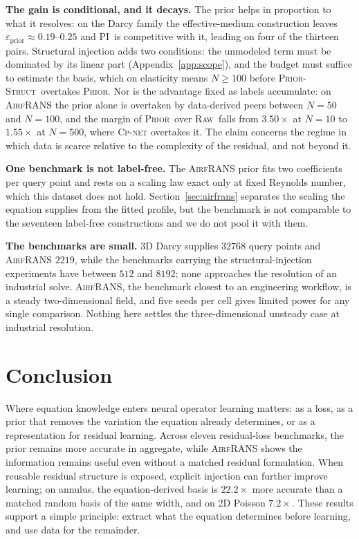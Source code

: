 \documentclass{article}
\newcommand{\armraw}{\textsc{Raw}}
\newcommand{\armpi}{\textsc{PI}}
\newcommand{\armprior}{\textsc{Prior}}
\newcommand{\armstruct}{\textsc{Prior-Struct}}
\begin{document}
\textbf{The gain is conditional, and it decays.} The prior helps in proportion to what it resolves: on the Darcy family the effective-medium construction leaves $\varepsilon_{\mathrm{prior}}\approx0.19$--$0.25$ and \armpi\ is competitive with it, leading on four of the thirteen pairs. Structural injection adds two conditions: the unmodeled term must be dominated by its linear part (Appendix~\ref{app:scope}), and the budget must suffice to estimate the basis, which on elasticity means $N\ge100$ before \armstruct\ overtakes \armprior. Nor is the advantage fixed as labels accumulate: on \textsc{AirfRANS} the prior alone is overtaken by data-derived peers between $N=50$ and $N=100$, and the margin of \armprior\ over \armraw\ falls from $3.50\times$ at $N=10$ to $1.55\times$ at $N=500$, where \textsc{Cp-net} overtakes it. The claim concerns the regime in which data is scarce relative to the complexity of the residual, and not beyond it.

\textbf{One benchmark is not label-free.} The \textsc{AirfRANS} prior fits two
coefficients per query point and rests on a scaling law exact only at fixed Reynolds
number, which this dataset does not hold. Section~\ref{sec:airfrans} separates the scaling the
equation supplies from the fitted profile, but the benchmark is not
comparable to the seventeen label-free constructions and we do not pool it with them.

\textbf{The benchmarks are small.} 3D Darcy supplies $32768$ query points and
\textsc{AirfRANS} $2219$, while the benchmarks carrying the structural-injection
experiments have between $512$ and $8192$; none approaches the resolution of an
industrial solve. \textsc{AirfRANS}, the benchmark closest to an engineering workflow, is a steady
two-dimensional field, and five seeds per cell gives limited power
for any single comparison. Nothing here settles the three-dimensional unsteady case at
industrial resolution.

\section{Conclusion}
\label{sec:conclusion}
\vspace{-3mm}
Where equation knowledge enters neural operator learning matters: as a loss, as a prior that removes the variation the equation already determines, or as a representation for residual learning. Across eleven residual-loss benchmarks, the prior remains more accurate in aggregate, while \textsc{AirfRANS} shows the information remains useful even without a matched residual formulation. When reusable residual structure is exposed, explicit injection can further improve learning; on annulus, the equation-derived basis is $22.2\times$ more accurate than a matched random basis of the same width, and on 2D Poisson $7.2\times$. These results support a simple principle: extract what the equation determines before learning, and use data for the remainder.
\end{document}
